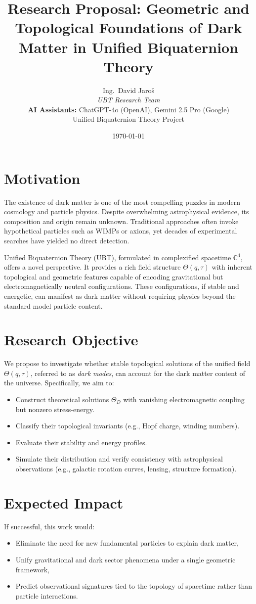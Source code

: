 \documentclass[12pt]{article}
\title{Research Proposal: Geometric and Topological Foundations of Dark Matter in Unified Biquaternion Theory}
\author{
Ing.~David Jaroš \\
\textit{UBT Research Team} \\
\textbf{AI Assistants:} ChatGPT-4o (OpenAI), Gemini 2.5 Pro (Google) \\
Unified Biquaternion Theory Project}
\date{\today}
\begin{document}
\maketitle

\section*{Motivation}
The existence of dark matter is one of the most compelling puzzles in modern cosmology and particle physics. Despite overwhelming astrophysical evidence, its composition and origin remain unknown. Traditional approaches often invoke hypothetical particles such as WIMPs or axions, yet decades of experimental searches have yielded no direct detection.

Unified Biquaternion Theory (UBT), formulated in complexified spacetime \( \mathbb{C}^4 \), offers a novel perspective. It provides a rich field structure \( \Theta(q, \tau) \) with inherent topological and geometric features capable of encoding gravitational but electromagnetically neutral configurations. These configurations, if stable and energetic, can manifest as dark matter without requiring physics beyond the standard model particle content.

\section*{Research Objective}
We propose to investigate whether stable topological solutions of the unified field \( \Theta(q, \tau) \), referred to as \emph{dark modes}, can account for the dark matter content of the universe. Specifically, we aim to:

\begin{itemize}
  \item Construct theoretical solutions \( \Theta_D \) with vanishing electromagnetic coupling but nonzero stress-energy.
  \item Classify their topological invariants (e.g., Hopf charge, winding numbers).
  \item Evaluate their stability and energy profiles.
  \item Simulate their distribution and verify consistency with astrophysical observations (e.g., galactic rotation curves, lensing, structure formation).
\end{itemize}

\section*{Expected Impact}
If successful, this work would:
\begin{itemize}
  \item Eliminate the need for new fundamental particles to explain dark matter,
  \item Unify gravitational and dark sector phenomena under a single geometric framework,
  \item Predict observational signatures tied to the topology of spacetime rather than particle interactions.
\end{itemize}
\end{document}

